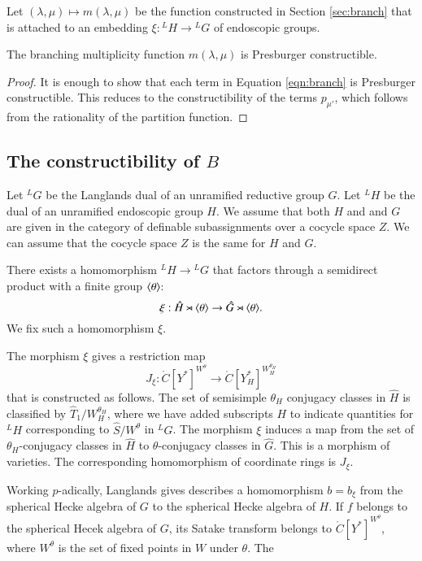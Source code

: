 \bigskip 

Let $(\lambda,\mu)\mapsto m(\lambda,\mu)$ be the function constructed in Section \ref{sec:branch}  that is attached
to an embedding $\xi:{}^LH\to {}^LG$ of endoscopic groups.

\begin{lemma}\label{lemma:branch} The branching multiplicity function $m(\lambda,\mu)$ is Presburger constructible.
\end{lemma}

\begin{proof} It is enough to show that each term in Equation \ref{eqn:branch} is Presburger constructible.
This reduces to the constructibility of the terms  $p_{\mu'}$, which follows from the
rationality of the partition function.
\end{proof}


\subsection{The constructibility of $B$}\label{sec:B}

Let ${}^LG$ be the Langlands dual of an unramified reductive group $G$.  Let ${}^LH$ be the dual of an
unramified endoscopic group $H$.  We assume that both $H$ and and $G$ are given in the category of definable subassignments
over a cocycle space $Z$.  We can assume that the cocycle space $Z$ is the same for $H$ and $G$.

There exists a homomorphism ${}^LH\to {}^LG$ that factors through a semidirect product with a finite group $\langle{\theta}\rangle$:
\[
\xi:\hat H \rtimes \langle{\theta}\rangle \to \hat G \rtimes \langle{\theta}\rangle.
\]
We fix such a homomorphism $\xi$.  

The morphism $\xi$ gives a restriction map
\begin{equation}
J_\xi:\ring{C}[Y^*]^{W^\theta} \to \ring{C}[Y^*_H]^{W_H^{\theta_H}}
\end{equation}
that is constructed as follows.  The set of semisimple $\theta_H$ conjugacy classes in 
$\hat H$ is classified by $\hat T_1/W_H^{\theta_H}$, where we have added subscripts $H$ to
indicate quantities for ${}^LH$ corresponding to $\hat S/W^\theta$ in ${}^LG$.
The morphism $\xi$ induces a map from the set of  $\theta_H$-conjugacy classes in $\hat H$
to $\theta$-conjugacy classes in $\hat G$.  This is a morphism of varieties. The corresponding
homomorphism of coordinate rings is $J_\xi$.


Working $p$-adically, Langlands gives describes a homomorphism $b = b_\xi$
from the spherical Hecke algebra of $G$ to the spherical Hecke algebra of $H$.
If $f$ belongs to the spherical Hecek algebra of $G$, its Satake transform belongs
to $\ring{C}[Y^*]^{W^\theta}$, where $W^\theta$ is the set of fixed points in $W$ under $\theta$.
The 




